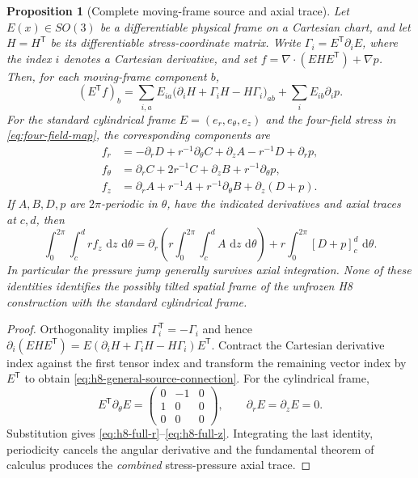 \documentclass[11pt,a4paper]{article}
\theoremstyle{plain}
\newtheorem{proposition}[theorem]{Proposition}
\theoremstyle{definition}
\newcommand{\dd}{\,\mathrm{d}}
\begin{document}
\begin{proposition}[Complete moving-frame source and axial trace]
\label{prop:h8-complete-moving-source}
Let $E(x)\in SO(3)$ be a differentiable physical frame on a
Cartesian chart, and let $H=H^{\mathsf T}$ be its differentiable
stress-coordinate matrix. Write
$\Gamma_i=E^{\mathsf T}\partial_iE$, where the index $i$ denotes
a Cartesian derivative, and set
$f=\nabla\cdot(EHE^{\mathsf T})+\nabla p$.
Then, for each moving-frame component $b$,
\begin{equation}\label{eq:h8-general-source-connection}
 (E^{\mathsf T}f)_b
 =\sum_{i,a}E_{ia}
 \bigl(\partial_iH+\Gamma_iH-H\Gamma_i\bigr)_{ab}
 +\sum_iE_{ib}\partial_i p.
\end{equation}
For the \emph{standard cylindrical} frame
$E=(e_r,e_\theta,e_z)$ and the four-field stress in
\eqref{eq:four-field-map}, the corresponding components are
\begin{align}
 f_r&=-\partial_rD+r^{-1}\partial_\theta C
             +\partial_zA-r^{-1}D+\partial_rp,\label{eq:h8-full-r}\\
 f_\theta&=\partial_rC+2r^{-1}C
             +\partial_zB+r^{-1}\partial_\theta p,\label{eq:h8-full-theta}\\
 f_z&=\partial_rA+r^{-1}A+r^{-1}\partial_\theta B
             +\partial_z(D+p).\label{eq:h8-full-z}
\end{align}
If $A,B,D,p$ are $2\pi$-periodic in $\theta$, have the indicated
derivatives and axial traces at $c,d$, then
\begin{equation}\label{eq:h8-axial-trace-balance}
 \int_0^{2\pi}\!\int_c^d r f_z\,\dd z\,\dd\theta
 =\partial_r\!\left(
 r\int_0^{2\pi}\!\int_c^d A\,\dd z\,\dd\theta\right)
 +r\int_0^{2\pi}[D+p]_{c}^{d}\,\dd\theta.
\end{equation}
In particular the pressure jump generally survives axial
integration. None of these identities identifies the possibly
tilted spatial frame of the unfrozen H8 construction with the
standard cylindrical frame.
\end{proposition}

\begin{proof}
Orthogonality implies
$\Gamma_i^{\mathsf T}=-\Gamma_i$ and hence
$\partial_i(EHE^{\mathsf T})
 =E(\partial_iH+\Gamma_iH-H\Gamma_i)E^{\mathsf T}$.
Contract the Cartesian derivative index against the first tensor
index and transform the remaining vector index by $E^{\mathsf T}$
to obtain \eqref{eq:h8-general-source-connection}. For the
cylindrical frame,
\[
E^{\mathsf T}\partial_\theta E
 =\begin{pmatrix}0&-1&0\\1&0&0\\0&0&0\end{pmatrix},
\qquad \partial_rE=\partial_zE=0.
\]
Substitution gives \eqref{eq:h8-full-r}--\eqref{eq:h8-full-z}.
Integrating the last identity, periodicity cancels the angular
derivative and the fundamental theorem of calculus produces
the \emph{combined} stress-pressure axial trace.
\end{proof}
\end{document}
